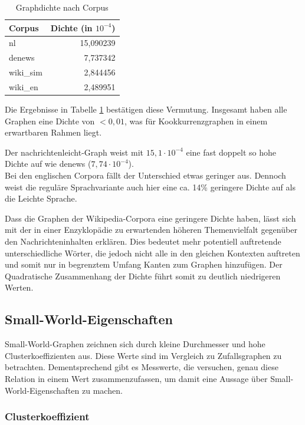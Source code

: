 \documentclass[11pt, a4paper]{article}
\begin{document}
\begin{table}[ht]
  \centering
  \begin{tabular}{lr}
    \toprule
    Corpus            &         Dichte (in $10^{-4}$)\\
    \midrule
    nl                &  		15,090239 \\
    denews            &  		7,737342 \\
    wiki\_sim         &  		2,844456 \\
    wiki\_en          &  		2,489951 \\
    \bottomrule
  \end{tabular}
  \caption{\label{density_table} Graphdichte nach Corpus}
\end{table}

Die Ergebnisse in Tabelle \ref{density_table} bestätigen diese Vermutung.
Insgesamt haben alle Graphen eine Dichte von $<0,01$, was für
Kookkurrenzgraphen in einem erwartbaren Rahmen liegt.

Der nachrichtenleicht-Graph weist mit $15,1\cdot 10^{-4}$ eine fast doppelt so
hohe Dichte auf wie denews ($7,74\cdot 10^{-4}$).\\
Bei den englischen Corpora fällt der Unterschied etwas geringer aus.
Dennoch weist die reguläre Sprachvariante auch hier eine ca. 14\% geringere
Dichte auf als die Leichte Sprache.

Dass die Graphen der Wikipedia-Corpora eine geringere Dichte haben, lässt sich
mit der in einer Enzyklopädie zu erwartenden höheren Themenvielfalt gegenüber
den Nachrichteninhalten erklären.
Dies bedeutet mehr potentiell auftretende unterschiedliche Wörter, die jedoch
nicht alle in den gleichen Kontexten auftreten und somit nur in begrenztem
Umfang Kanten zum Graphen hinzufügen.
Der Quadratische Zusammenhang der Dichte
führt somit zu deutlich niedrigeren Werten. 


\subsection{Small-World-Eigenschaften}

Small-World-Graphen zeichnen sich durch kleine Durchmesser und hohe Clusterkoeffizienten aus.
Diese Werte sind im Vergleich zu Zufallsgraphen zu betrachten.
Dementsprechend gibt es Messwerte, die versuchen, genau diese Relation in einem Wert zusammenzufassen, um damit eine Aussage über Small-World-Eigenschaften zu machen. 


\subsubsection{Clusterkoeffizient}
\end{document}
